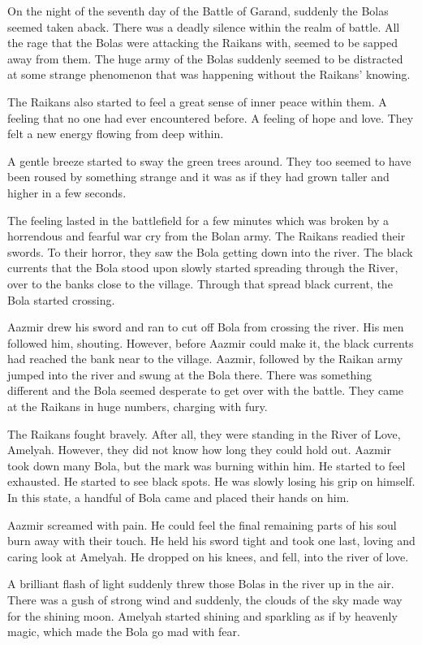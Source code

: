 \documentclass[twoside,11pt,titlepage]{article}
\begin{document}
On the night of the seventh day of the Battle of Garand, suddenly the Bolas seemed taken aback. There was a deadly silence within the realm of battle. All the rage that the Bolas were attacking the Raikans with, seemed to be sapped away from them. The huge army of the Bolas suddenly seemed to be distracted at some strange phenomenon that was happening without the Raikans' knowing.

The Raikans also started to feel a great sense of inner peace within them. A feeling that no one had ever encountered before. A feeling of hope and love. They felt a new energy flowing from deep within.

A gentle breeze started to sway the green trees around. They too seemed to have been roused by something strange and it was as if they had grown taller and higher in a few seconds.

The feeling lasted in the battlefield for a few minutes which was broken by a horrendous and fearful war cry from the Bolan army. The Raikans readied their swords. To their horror, they saw the Bola getting down into the river. The black currents that the Bola stood upon slowly started spreading through the River, over to the banks close to the village. Through that spread black current, the Bola started crossing.

Aazmir drew his sword and ran to cut off Bola from crossing the river. His men followed him, shouting. However, before Aazmir could make it, the black currents had reached the bank near to the village. Aazmir, followed by the Raikan army jumped into the river and swung at the Bola there. There was something different and the Bola seemed desperate to get over with the battle. They came at the Raikans in huge numbers, charging with fury.

The Raikans fought bravely. After all, they were standing in the River of Love, Amelyah. However, they did not know how long they could hold out. Aazmir took down many Bola, but the mark was burning within him. He started to feel exhausted. He started to see black spots. He was slowly losing his grip on himself. In this state, a handful of Bola came and placed their hands on him.

Aazmir screamed with pain. He could feel the final remaining parts of his soul burn away with their touch. He held his sword tight and took one last, loving and caring look at Amelyah. He dropped on his knees, and fell, into the river of love.

A brilliant flash of light suddenly threw those Bolas in the river up in the air. There was a gush of strong wind and suddenly, the clouds of the sky made way for the shining moon. Amelyah started shining and sparkling as if by heavenly magic, which made the Bola go mad with fear.
\end{document}
